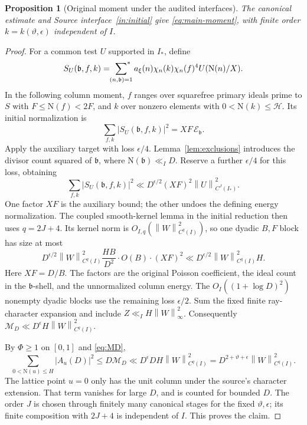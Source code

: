 \documentclass[11pt]{article}
\numberwithin{equation}{section}
\newtheorem{proposition}[theorem]{Proposition}
\theoremstyle{definition}
\theoremstyle{remark}
\newcommand{\E}{\mathcal E}
\newcommand{\N}{\mathrm N}
\newcommand{\norm}[1]{\left\|#1\right\|}
\newcommand{\sfstar}{\sideset{}{^*}\sum}
\begin{document}
\begin{proposition}[Original moment under the audited interfaces]
\label{prop:original-moment}
The canonical estimate and Source interface~\ref{in:initial}
give \eqref{eq:main-moment}, with finite order
\(k=k(\vartheta,\epsilon)\) independent of \(I\).
\end{proposition}
\begin{proof}
For a common test \(U\) supported in \(I_*\), define
\[
 S_U(\mathfrak b,f,k)=
 \sfstar_{(n,\mathfrak b)=1}a_\xi(n)\chi_n(k)\chi_n(f)^4
                              U(\N(n)/X).
\]
In the following column moment, \(f\) ranges over squarefree primary
ideals prime to \(S\) with \(F\le\N(f)<2F\), and \(k\) over
nonzero elements with \(0<\N(k)\le\mathcal H\). Its initial
normalization is
\[
 \sum_{f,k}|S_U(\mathfrak b,f,k)|^2=XF\,\E_{\mathfrak b}.
\]
Apply the auxiliary target with loss \(\epsilon/4\).
Lemma~\ref{lem:exclusions} introduces the divisor count squared
of \(\mathfrak b\), where \(\N(\mathfrak b)\ll_I D\). Reserve a further
\(\epsilon/4\) for this loss, obtaining
\[
 \sum_{f,k}|S_U(\mathfrak b,f,k)|^2
 \ll D^{\epsilon/2}(XF)^2\norm{U}_{C^J(I_*)}^2.
\]
One factor \(XF\) is the auxiliary bound; the other undoes
the defining energy normalization. The coupled smooth-kernel
lemma in the initial reduction then uses \(q=2J+4\).
Its kernel norm is \(O_{I,q}(\norm{W}_{C^q(I)}^2)\),
so one dyadic \(B,F\) block has size at most
\[
 D^{\epsilon/2}\norm{W}_{C^q(I)}^2
  \frac{HB}{D^2}\cdot O(B)\cdot(XF)^2
 \ll D^{\epsilon/2}\norm{W}_{C^q(I)}^2H.
\]
Here \(XF=D/B\). The factors are the original Poisson
coefficient, the ideal count in the \(\mathfrak b\)-shell, and the
unnormalized column energy. The \(O_I((1+\log D)^2)\)
nonempty dyadic blocks use the remaining loss
\(\epsilon/2\). Sum the fixed finite ray-character expansion
and include \(Z\ll_I H\norm{W}_\infty^2\).
Consequently \(\mathcal M_D\ll
D^\epsilon H\norm{W}_{C^q(I)}^2\).

By \(\Phi\ge1\) on \([0,1]\) and \eqref{eq:MD},
\[
 \sum_{0<\N(u)\le H}|A_u(D)|^2
 \le D\mathcal M_D
 \ll D^\epsilon DH\norm{W}_{C^q(I)}^2
 =D^{2+\vartheta+\epsilon}\norm{W}_{C^q(I)}^2 .
\]
The lattice point \(u=0\) only has the unit column under
the source's character extension. That term vanishes for
large \(D\), and is counted for bounded \(D\). The order
\(J\) is chosen through finitely many canonical stages for
the fixed \(\vartheta,\epsilon\); its finite composition
with \(2J+4\) is independent of \(I\). This proves the claim.
\end{proof}
\end{document}
